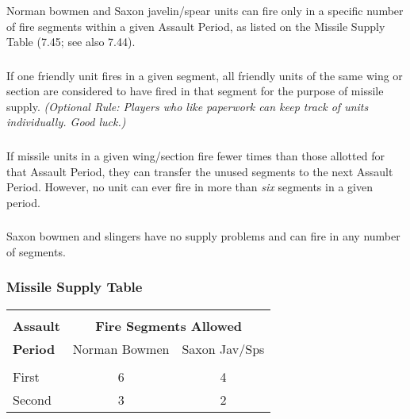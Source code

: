 \subsubsection[Fire Segment]{} Norman bowmen and Saxon javelin/spear units can fire only in a specific number of fire segments within a given Assault Period, as listed on the Missile Supply Table (7.45; see also 7.44).

\subsubsection[One and All]{} If one friendly unit fires in a given segment, all friendly units of the same wing or section are considered to have fired in that segment for the purpose of missile supply. \textit{(Optional Rule: Players who like paperwork can keep track of units individually. Good luck.)}

\subsubsection[Saving Ammo]{} If missile units in a given wing/section fire fewer times than those allotted for that Assault Period, they can transfer the unused segments to the next Assault Period. However, no unit can ever fire in more than \textit{six} segments in a given period.

\subsubsection[Saxon Bowmen]{} Saxon bowmen and slingers have no supply problems and can fire in any number of segments.

\begin{hangsubsubsection}
  \subsubsection{Missile Supply Table}
\end{hangsubsubsection}

\begin{tabular}{ |l|cc| }
  \hline & & \\[-2.0ex]
  \textbf{Assault} & \multicolumn{2}{c|}{\textbf{Fire Segments Allowed}} \\
  \textbf{Period} & Norman Bowmen & Saxon Jav/Sps \\
  \hline & &\\ [-2.0ex]
  First & 6 & 4 \\
  Second & 3 & 2 \\
  \hline
\end{tabular}

